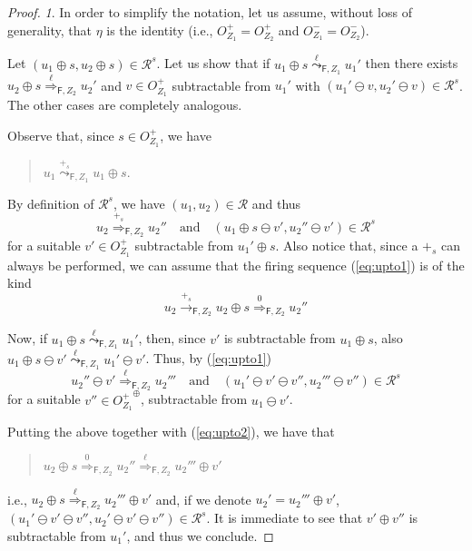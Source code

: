 \documentclass{LMCS}
\newcommand{\mon}[1]{\ensuremath{{#1}^\oplus}}
\newcommand{\ltr}[3][x]{\ensuremath{\stackrel{{#3}}{\longrightarrow}_{\mathsf{#1},#2}}}
\newcommand{\wltr}[3][x]{\ensuremath{\stackrel{{#3}}{\leadsto}_{\mathsf{#1},#2}}}
\newcommand{\Ltr}[3][x]{\ensuremath{\stackrel{{#3}}{\Longrightarrow}_{\mathsf{#1},#2}}}
\begin{document}
\begin{proof}

  \emph{1}. 
In order to simplify the notation, let us assume, without loss of
  generality, that $\eta$ is the identity (i.e., $O_{Z_1}^+ = O_{Z_2}^+$
  and $O_{Z_1}^- = O_{Z_2}^-$).

  Let $(u_1 \oplus s, u_2 \oplus s) \in \mathcal{R}^s$. Let us show
  that if $u_1 \oplus s \wltr[F]{Z_1}{\ell} u_1'$ then there exists $u_2
  \oplus s \Ltr[F]{Z_2}{\ell} u_2'$ and $v \in O_{Z_1}^+$ subtractable from
  $u_1'$ with $(u_1' \ominus v, u_2' \ominus v) \in \mathcal{R}^s$.
  The other cases are completely analogous.

  Observe that, since $s \in O_{Z_1}^+$, we have
  \begin{quote}
    $u_1 \wltr[F]{Z_1}{+_s} u_1 \oplus s$.
  \end{quote}
  By definition of $\mathcal{R}^s$, we have $(u_1,u_2) \in \mathcal{R}$
  and thus
  \begin{equation}
    \label{eq:upto1}
    u_2 \Ltr[F]{Z_2}{+_s} u_2'' \quad \text{and} \quad 
    (u_1 \oplus s \ominus v', u_2'' \ominus v') \in
    \mathcal{R}^s
  \end{equation}
  for a suitable $v' \in O_{Z_1}^+$ subtractable from $u_1' \oplus s$.
  Also notice that, since a $+_s$ can always be
  performed, we can assume that the firing sequence (\ref{eq:upto1})
  is of the kind
  \begin{equation}
    \label{eq:upto2}
    u_2 \ltr[F]{Z_2}{+_s} u_2 \oplus s \Ltr[F]{Z_2}{0} u_2''
  \end{equation}
  
  Now, if $u_1 \oplus s \wltr[F]{Z_1}{\ell} u_1'$, then, since $v'$ is
  subtractable from $u_1 \oplus s$, also $u_1 \oplus s \ominus v'
  \wltr[F]{Z_1}{\ell} u_1' \ominus v'$.
Thus, by (\ref{eq:upto1})
  \begin{equation}
    \label{eq:upto3}
    u_2'' \ominus v' \Ltr[F]{Z_2}{\ell} u_2''' \quad \text{and} \quad (u_1' \ominus v' \ominus v'', u_2''' \ominus v'') \in
  \mathcal{R}^s
  \end{equation}
  for a suitable $v'' \in \mon{O_{Z_1}^+}$, subtractable from $u_1 \ominus v'$.

  Putting the above together with (\ref{eq:upto2}), we have that
  \begin{quote}
    $u_2 \oplus s \Ltr[F]{Z_2}{0} u_2'' \Ltr[F]{Z_2}{\ell} u_2''' \oplus v'$
  \end{quote}
  i.e., $u_2 \oplus s \Ltr[F]{Z_2}{\ell} u_2''' \oplus v'$ and, if we
  denote $u_2' = u_2''' \oplus v'$, $(u_1' \ominus v' \ominus v'',
  u_2' \ominus v' \ominus v'') \in \mathcal{R}^s$. It is immediate to
  see that $v' \oplus v''$ is subtractable from $u_1'$, and thus we
  conclude.


\end{proof}
\end{document}
